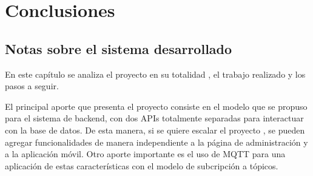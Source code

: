 
\chapter{Conclusiones} %

\label{Chapter5} %




\section{Notas sobre el sistema desarrollado }



En este capítulo se analiza el proyecto en su totalidad , el trabajo realizado y los pasos a seguir.



El principal aporte que presenta el proyecto consiste en el modelo que se propuso para el sistema de backend, con dos APIs totalmente separadas para interactuar con la base de datos. De esta manera, si se quiere escalar el proyecto , se pueden agregar funcionalidades de manera independiente a la página de administración y a la aplicación móvil. Otro aporte importante es el uso de MQTT para una aplicación de estas características con el modelo de subcripción a tópicos.

